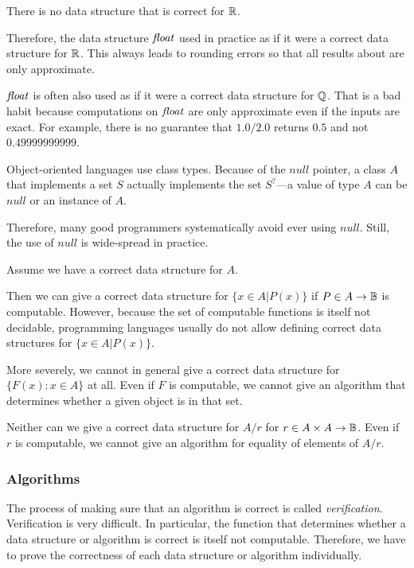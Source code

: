 \begin{example}
There is no data structure that is correct for $\mathbb{R}$.

Therefore, the data structure $\mathit{float}$ used in practice as if it were a correct data structure for $\mathbb{R}$.
This always leads to rounding errors so that all results about are only approximate.

$\mathit{float}$ is often also used as if it were a correct data structure for $\mathbb{Q}$.
That is a bad habit because computations on $\mathit{float}$ are only approximate even if the inputs are exact.
For example, there is no guarantee that $1.0/2.0$ returns $0.5$ and not $0.49999999999$.
\end{example}

\begin{example}
Object-oriented languages use class types.
Because of the $null$ pointer, a class $A$ that implements a set $S$ actually implements the set $S^?$---a value of type $A$ can be $null$ or an instance of $A$.

Therefore, many good programmers systematically avoid ever using $null$.
Still, the use of $null$ is wide-spread in practice.
\end{example}

\begin{example}
Assume we have a correct data structure for $A$.
\medskip

Then we can give a correct data structure for $\{x\in A|P(x)\}$ if $P\in A \to \mathbb{B}$ is computable.
However, because the set of computable functions is itself not decidable, programming languages usually do not allow defining correct data structures for $\{x\in A|P(x)\}$.

More severely, we cannot in general give a correct data structure for $\{F(x):x\in A\}$ at all.
Even if $F$ is computable, we cannot give an algorithm that determines whether a given object is in that set.

Neither can we give a correct data structure for $A/r$ for $r\in A\times A\to \mathbb{B}$.
Even if $r$ is computable, we cannot give an algorithm for equality of elements of $A/r$.
\end{example}

\subsubsection{Algorithms}

The process of making sure that an algorithm is correct is called \emph{verification}.
Verification is very difficult.
In particular, the function that determines whether a data structure or algorithm is correct is itself not computable.
Therefore, we have to prove the correctness of each data structure or algorithm individually.

